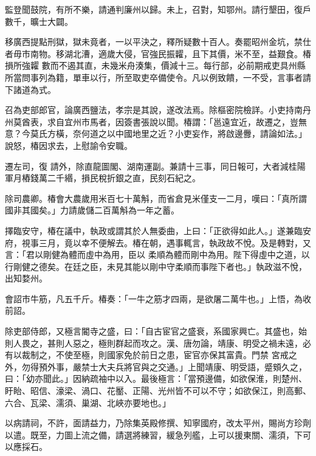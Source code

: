 \begin{pinyinscope}
 監登聞鼓院，有所不樂，請通判廉州以歸。未上，召對，知鄂州。請行墾田，復戶數千，曠士大闢。



 移廣西提點刑獄，獄未竟者，一以平決之，釋所疑數十百人。奏罷昭州金坑，禁仕者毋市南物。移湖北漕，適歲大侵，官強民振糶，且下其價，米不至，益艱食。椿損所強糶
 數而不遏其直，未幾米舟湊集，價減十三。每行部，必前期戒吏具州縣所當問事列為籍，單車以行，所至取吏卒備使令。凡以例致饋，一不受，言事者請下諸道為式。



 召為吏部郎官，論廣西鹽法，孝宗是其說，遂改法焉。除樞密院檢詳。小吏持南丹州莫酋表，求自宜州市馬者，因簽書張說以聞。椿謂：「邕遠宜近，故遷之，豈無意？今莫氏方橫，奈何道之以中國地里之近？小吏妄作，將啟邊釁，請論如法。」說怒，椿因求去，上慰諭令安職。



 遷左司，復
 請外，除直龍圖閣、湖南運副。兼請十三事，同日報可，大者減桂陽軍月樁錢萬二千緡，損民稅折銀之直，民刻石紀之。



 除司農卿。椿會大農歲用米百七十萬斛，而省倉見米僅支一二月，嘆曰：「真所謂國非其國矣。」力請歲儲二百萬斛為一年之蓄。



 擇臨安守，椿在議中，執政或謂其於人無委曲，上曰：「正欲得如此人。」遂兼臨安府，視事三月，竟以幸不便解去。椿在朝，遇事輒言，執政故不悅。及是轉對，又言：「君以剛健為體而虛中為用，臣以
 柔順為體而剛中為用。陛下得虛中之道，以行剛健之德矣。在廷之臣，未見其能以剛中守柔順而事陛下者也。」執政滋不悅，出知婺州。



 會詔市牛筋，凡五千斤。椿奏：「一牛之筋才四兩，是欲屠二萬牛也。」上悟，為收前詔。



 除吏部侍郎，又極言閽寺之盛，曰：「自古宦官之盛衰，系國家興亡。其盛也，始則人畏之，甚則人惡之，極則群起而攻之。漢、唐勿論，靖康、明受之禍未遠，必有以裁制之，不使至極，則國家免於前日之患，宦官亦保其富貴。門禁
 宮戒之外，勿得預外事，嚴禁士大夫兵將官與之交通。」上聞靖康、明受語，蹙頞久之，曰：「幼亦聞此。」因納疏袖中以入。最後極言：「當預邊備，如欲保淮，則楚州、盱眙、昭信、濠梁、渦口、花靨、正陽、光州皆不可以不守；如欲保江，則高郵、六合、瓦梁、濡須、巢湖、北峽亦要地也。」



 以病請祠，不許，面請益力，乃除集英殿修撰、知寧國府，改太平州，賜尚方珍劑以遣。既至，力圖上流之備，請選將練習，緩急列艦，上可以援東關、濡須，下可以應採石。




\end{pinyinscope}
